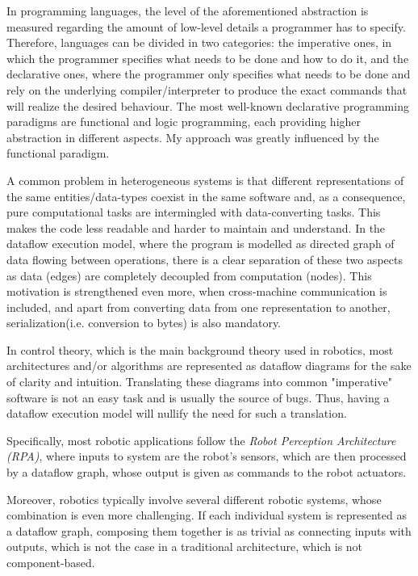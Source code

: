 \documentclass{dithesis}
\begin{document}
In programming languages, the level of the aforementioned abstraction is measured regarding the amount of low-level details a programmer has to specify. Therefore, languages can be divided in two categories: the imperative ones, in which the programmer specifies what needs to be done and how to do it, and the declarative ones, where the programmer only specifies what needs to be done and rely on the underlying compiler/interpreter to produce the exact commands that will realize the desired behaviour. The most well-known declarative programming paradigms are functional and logic programming, each providing higher abstraction in different aspects. My approach was greatly influenced by the functional paradigm.


A common problem in heterogeneous systems is that different representations of the same entities/data-types coexist in the same software and, as a consequence, pure computational tasks are intermingled with data-converting tasks. This makes the code less readable and harder to maintain and understand. In the dataflow execution model, where the program is modelled as directed graph of data flowing between operations, there is a clear separation of these two aspects as data (edges) are completely decoupled from computation (nodes). This motivation is strengthened even more, when cross-machine communication is included, and apart from converting data from one representation to another, serialization(i.e. conversion to bytes) is also mandatory.


In control theory, which is the main background theory used in robotics, most architectures and/or algorithms are represented as dataflow diagrams for the sake of clarity and intuition. Translating these diagrams into common "imperative" software is not an easy task and is usually the source of bugs. Thus, having a dataflow execution model will nullify the need for such a translation.

Specifically, most robotic applications follow the \textit{Robot Perception Architecture (RPA)}, where inputs to system are the robot's sensors, which are then processed by a dataflow graph, whose output is given as commands to the robot actuators.

Moreover, robotics typically involve several different robotic systems, whose combination is even more challenging. If each individual system is represented as a dataflow graph, composing them together is as trivial as connecting inputs with outputs, which is not the case in a traditional architecture, which is not component-based.
\end{document}
